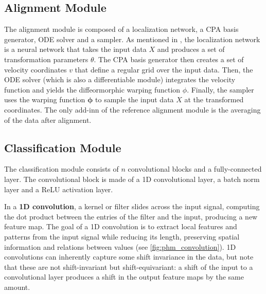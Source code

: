 \subsection{Alignment Module}
The alignment module is composed of a localization network, a CPA basis generator, ODE solver and a sampler. As mentioned in \cite{martinez2022closed}, the localization network is a neural network that takes the input data $X$ and produces a set of transformation parameters $\theta$. The CPA basis generator then creates a set of velocity coordinates $v$ that define a regular grid over the input data. Then, the ODE solver (which is also a differentiable module) integrates the velocity function and yields the diffeormorphic warping function $\phi$. Finally, the sampler uses the warping function $\boldsymbol{\phi}$ to sample the input data $X$ at the transformed coordinates.
The only add-inn of the reference alignment module is the averaging of the data after alignment.





\subsection{Classification Module}
The classification module consists of $n$ convolutional blocks and a fully-connected layer. The convolutional block is made of a 1D convolutional layer, a batch norm layer and a ReLU activation layer. 

In a \textbf{1D convolution}, a kernel or filter slides across the input signal, computing the dot product between the entries of the filter and the input, producing a new feature map. The goal of a 1D convolution is to extract local features and patterns from the input signal while reducing its length, preserving spatial information and relations between values (see \cref{fig:phm_convolution}). 1D convolutions can inherently capture some shift invariance in the data, but note that these are not shift-invariant but shift-equivariant: a shift of the input to a convolutional layer produces a shift in the output feature maps by the same amount. 

